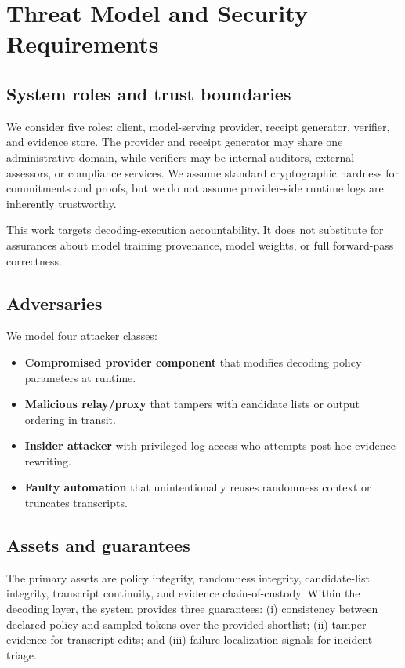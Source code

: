 \documentclass[conference]{IEEEtran}
\begin{document}
\section{Threat Model and Security Requirements}
\subsection{System roles and trust boundaries}
We consider five roles: client, model-serving provider, receipt generator, verifier, and evidence store. The provider and receipt generator may share one administrative domain, while verifiers may be internal auditors, external assessors, or compliance services. We assume standard cryptographic hardness for commitments and proofs, but we do not assume provider-side runtime logs are inherently trustworthy.

This work targets decoding-execution accountability. It does not substitute for assurances about model training provenance, model weights, or full forward-pass correctness.

\subsection{Adversaries}
We model four attacker classes:
\begin{itemize}
\item \textbf{Compromised provider component} that modifies decoding policy parameters at runtime.
\item \textbf{Malicious relay/proxy} that tampers with candidate lists or output ordering in transit.
\item \textbf{Insider attacker} with privileged log access who attempts post-hoc evidence rewriting.
\item \textbf{Faulty automation} that unintentionally reuses randomness context or truncates transcripts.
\end{itemize}

\subsection{Assets and guarantees}
The primary assets are policy integrity, randomness integrity, candidate-list integrity, transcript continuity, and evidence chain-of-custody. Within the decoding layer, the system provides three guarantees: (i) consistency between declared policy and sampled tokens over the provided shortlist; (ii) tamper evidence for transcript edits; and (iii) failure localization signals for incident triage.
\end{document}

